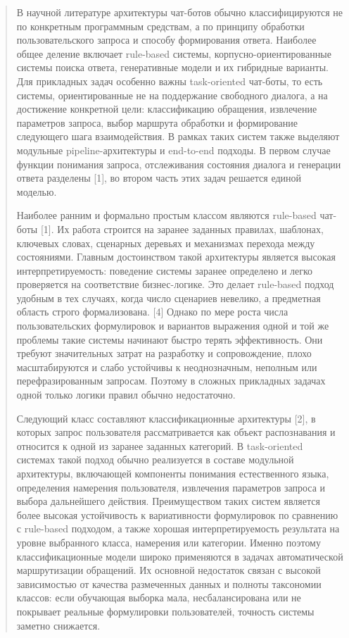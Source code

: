 \documentclass[
]{article}
\begin{document}
\begin{quote}
В научной литературе архитектуры чат-ботов обычно классифицируются не по
конкретным программным средствам, а по принципу обработки
пользовательского запроса и способу формирования ответа. Наиболее общее
деление включает rule-based системы, корпусно-ориентированные системы
поиска ответа, генеративные модели и их гибридные варианты. Для
прикладных задач особенно важны task-oriented чат-боты, то есть системы,
ориентированные не на поддержание свободного диалога, а на достижение
конкретной цели: классификацию обращения, извлечение параметров запроса,
выбор маршрута обработки и формирование следующего шага взаимодействия.
В рамках таких систем также выделяют модульные pipeline-архитектуры и
end-to-end подходы. В первом случае функции понимания запроса,
отслеживания состояния диалога и генерации ответа разделены {[}1{]}, во
втором часть этих задач решается единой моделью.

Наиболее ранним и формально простым классом являются rule-based чат-боты
{[}1{]}. Их работа строится на заранее заданных правилах, шаблонах,
ключевых словах, сценарных деревьях и механизмах перехода между
состояниями. Главным достоинством такой архитектуры является высокая
интерпретируемость: поведение системы заранее определено и легко
проверяется на соответствие бизнес-логике. Это делает rule-based подход
удобным в тех случаях, когда число сценариев невелико, а предметная
область строго формализована. {[}4{]} Однако по мере роста числа
пользовательских формулировок и вариантов выражения одной и той же
проблемы такие системы начинают быстро терять эффективность. Они требуют
значительных затрат на разработку и сопровождение, плохо масштабируются
и слабо устойчивы к неоднозначным, неполным или перефразированным
запросам. Поэтому в сложных прикладных задачах одной только логики
правил обычно недостаточно.

Следующий класс составляют классификационные архитектуры {[}2{]}, в
которых запрос пользователя рассматривается как объект распознавания и
относится к одной из заранее заданных категорий. В task-oriented
системах такой подход обычно реализуется в составе модульной
архитектуры, включающей компоненты понимания естественного языка,
определения намерения пользователя, извлечения параметров запроса и
выбора дальнейшего действия. Преимуществом таких систем является более
высокая устойчивость к вариативности формулировок по сравнению с
rule-based подходом, а также хорошая интерпретируемость результата на
уровне выбранного класса, намерения или категории. Именно поэтому
классификационные модели широко применяются в задачах автоматической
маршрутизации обращений. Их основной недостаток связан с высокой
зависимостью от качества размеченных данных и полноты таксономии
классов: если обучающая выборка мала, несбалансирована или не покрывает
реальные формулировки пользователей, точность системы заметно снижается.


\end{quote}
\end{document}

